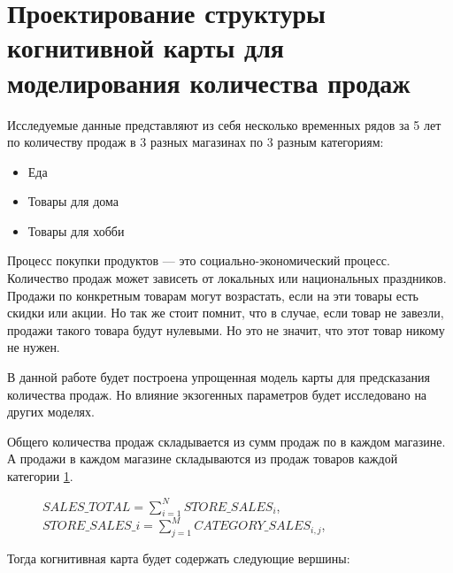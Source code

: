 \section{Проектирование структуры когнитивной карты для моделирования количества продаж}

Исследуемые данные представляют из себя несколько временных рядов
за 5 лет по количеству продаж в 3 разных магазинах по 3 разным категориям:

\begin{itemize}
	\item Еда
	\item Товары для дома
	\item Товары для хобби
\end{itemize}

Процесс покупки продуктов --- это социально-экономический процесс.
Количество продаж может зависеть от локальных или национальных праздников.
Продажи по конкретным товарам могут возрастать, если на эти товары есть скидки или акции.
Но так же стоит помнит, что в случае, если товар не завезли,
продажи такого товара будут нулевыми. Но это не значит, что этот товар никому не нужен.

В данной работе будет построена упрощенная модель карты для предсказания количества продаж.
Но влияние экзогенных параметров будет исследовано на других моделях.

Общего количества продаж складывается из сумм продаж
по в каждом магазине. А продажи в каждом магазине складываются из продаж
товаров каждой категории \ref{img:sales_simple_model}.

\def\figurename{Формула}
\begin{figure}[t]
	\centering
	$ SALES\_TOTAL = \sum_{i=1}^{N} STORE\_SALES_{i} $,
	$ STORE\_SALES\_{i} = \sum_{j=1}^{M} CATEGORY\_SALES_{i,j} $,
	\caption{}
	\label{img:sales_simple_model}
\end{figure}
\def\figurename{Рис.}

Тогда когнитивная карта будет содержать следующие вершины:

